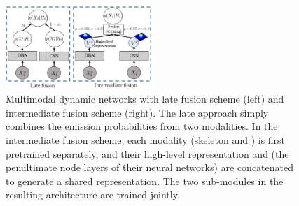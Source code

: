 \begin{figure}[t]
  \centering
  \includegraphics[width=0.5\textwidth]{images/Fusion_combined}
\vspace*{-2mm}
\caption{
\small{
Multimodal dynamic networks with late fusion scheme (left) and intermediate fusion scheme (right).
The late approach simply combines the emission probabilities from two modalities.
In the intermediate fusion scheme, each modality (skeleton and \RGBD) is first pretrained separately,
and their high-level representation \highSK and \highRGBD (the penultimate node layers of their neural networks)
are concatenated to generate a shared representation. The two sub-modules in the resulting architecture are trained jointly.}
  }\label{fig:fusion}
\end{figure}



\endinput
